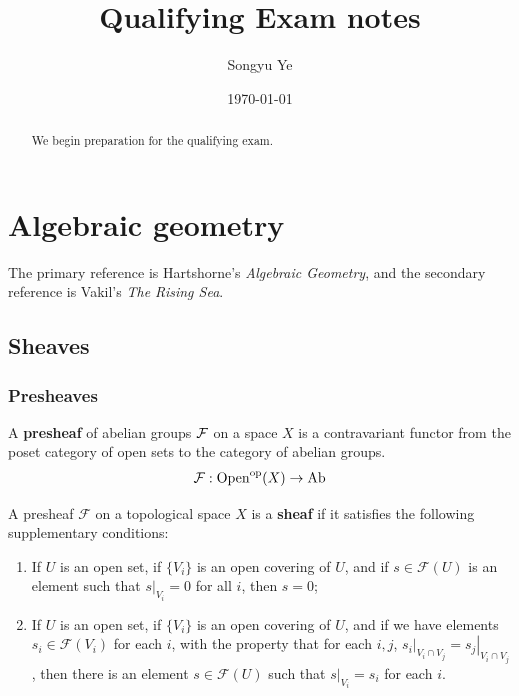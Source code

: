 \documentclass[12pt]{article}
\title{Qualifying Exam notes}
\author{Songyu Ye}
\date{\today}
\begin{document}
\notestitle

\begin{abstract}
    We begin preparation for the qualifying exam.
\end{abstract}

\tableofcontents

\section{Algebraic geometry}
The primary reference is Hartshorne's \textit{Algebraic Geometry}, and the secondary reference is Vakil's \textit{The Rising Sea}.

\subsection{Sheaves}
\subsubsection{Presheaves}
\begin{definition}
    A \textbf{presheaf} of abelian groups ${\mathcal{F}}$ on a space $X$ is a contravariant functor from the poset category of open sets to the category of abelian groups. \begin{align*}
        {\mathcal{F}}:\operatorname{Open}^{\operatorname{op}}(X) \to \operatorname{Ab}
    \end{align*}
\end{definition}



\begin{definition}
    A presheaf $\mathcal{F}$ on a topological space $X$ is a \textbf{sheaf} if it satisfies the following supplementary conditions:

    \begin{enumerate}

        \item[\textbf{Separated}] If $U$ is an open set, if $\{V_{i}\}$ is an open covering of $U$, and if $s \in \mathcal{F}(U)$ is an element such that $\left.s\right|_{V_{i}} = 0$ for all $i$, then $s = 0$;

        \item[\textbf{Gluing}] If $U$ is an open set, if $\{V_{i}\}$ is an open covering of $U$, and if we have elements $s_{i} \in \mathcal{F}(V_{i})$ for each $i$, with the property that for each $i,j$, $\left.s_{i}\right|_{V_{i} \cap V_{j}} = \left.s_{j}\right|_{V_{i} \cap V_{j}}$, then there is an element $s \in \mathcal{F}(U)$ such that $\left.s\right|_{V_{i}} = s_{i}$ for each $i$.
    \end{enumerate}
\end{definition}
\end{document}
